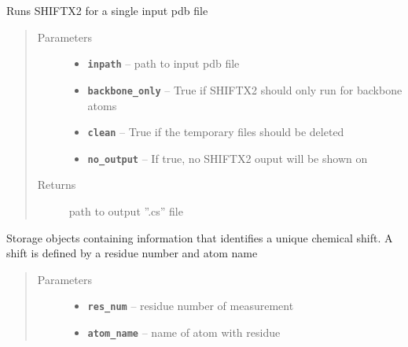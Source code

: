 \documentclass[letterpaper,10pt,english]{sphinxmanual}
\begin{document}
\begin{fulllineitems}
\begin{fulllineitems}
\label{modules:readutil.RunShiftX.run_shiftx_once}
Runs SHIFTX2 for a single input pdb file
\begin{quote}\begin{description}
\item[{Parameters}] \leavevmode\begin{itemize}
\item {} 
\textbf{\texttt{inpath}} -- path to input pdb file

\item {} 
\textbf{\texttt{backbone\_only}} -- True if SHIFTX2 should only run for backbone atoms

\item {} 
\textbf{\texttt{clean}} -- True if the temporary files should be deleted

\item {} 
\textbf{\texttt{no\_output}} -- If true, no SHIFTX2 ouput will be shown on

\end{itemize}

\item[{Returns}] \leavevmode
path to output ''.cs'' file

\end{description}\end{quote}

\end{fulllineitems}


\end{fulllineitems}


\begin{fulllineitems}
\label{modules:readutil.ShiftID}
Storage objects containing information that identifies a unique chemical
shift. A shift is defined by a residue number and atom name
\begin{quote}\begin{description}
\item[{Parameters}] \leavevmode\begin{itemize}
\item {} 
\textbf{\texttt{res\_num}} -- residue number of measurement

\item {} 
\textbf{\texttt{atom\_name}} -- name of atom with residue

\end{itemize}

\end{description}\end{quote}

\end{fulllineitems}
\end{document}

